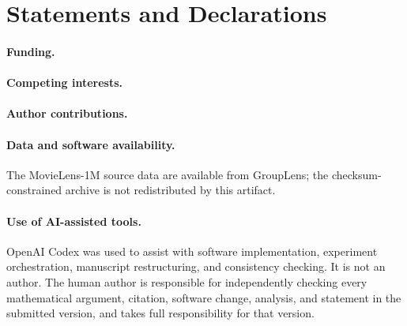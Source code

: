 \section*{Statements and Declarations}

\paragraph{Funding.}
\FundingStatement

\paragraph{Competing interests.}
\CompetingInterestsStatement

\paragraph{Author contributions.}
\AuthorContributionsStatement

\paragraph{Data and software availability.}
\RepositoryStatement{} The MovieLens-1M source data are available from GroupLens;
the checksum-constrained archive is not redistributed by this artifact.

\paragraph{Use of AI-assisted tools.}
OpenAI Codex was used to assist with software implementation, experiment
orchestration, manuscript restructuring, and consistency checking.  It is not an author.
The human author is responsible for independently checking every
mathematical argument, citation, software change, analysis, and statement in
the submitted version, and takes full responsibility for that version.
